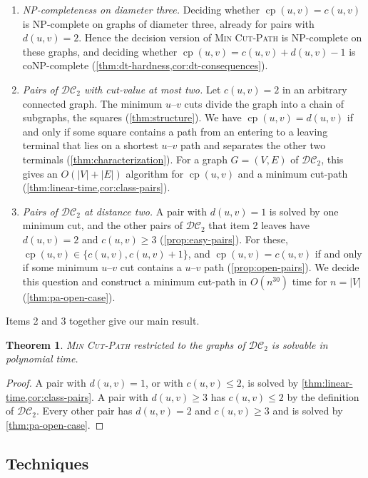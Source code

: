 \documentclass[pdflatex,sn-mathphys-num]{sn-jnl}%
\theoremstyle{thmstyleone}%
\newtheorem{theorem}{Theorem}%
\theoremstyle{thmstyletwo}%
\theoremstyle{thmstylethree}%
\newcommand{\cp}{\operatorname{cp}}%
\newcommand{\DC}{\mathcal{DC}_2}%
\newcommand{\MinCutPath}{\textsc{Min Cut-Path}}%
\begin{document}
\begin{enumerate}
\item \emph{NP-completeness on diameter three.}
Deciding whether $\cp(u, v) = c(u, v)$ is NP-complete on graphs of diameter three, already for pairs with $d(u, v) = 2$.
Hence the decision version of \MinCutPath{} is NP-complete on these graphs, and deciding whether $\cp(u, v) = c(u, v) + d(u, v) - 1$ is coNP-complete (\cref{thm:dt-hardness,cor:dt-consequences}).

\item \emph{Pairs of $\DC$ with cut-value at most two.}
Let $c(u, v) = 2$ in an arbitrary connected graph.
The minimum $u$--$v$ cuts divide the graph into a chain of subgraphs, the squares (\cref{thm:structure}).
We have $\cp(u, v) = d(u, v)$ if and only if some square contains a path from an entering to a leaving terminal that lies on a shortest $u$--$v$ path and separates the other two terminals (\cref{thm:characterization}).
For a graph $G = (V, E)$ of $\DC$, this gives an $O(|V| + |E|)$ algorithm for $\cp(u, v)$ and a minimum cut-path (\cref{thm:linear-time,cor:class-pairs}).

\item \emph{Pairs of $\DC$ at distance two.}
A pair with $d(u, v) = 1$ is solved by one minimum cut, and the other pairs of $\DC$ that item 2 leaves have $d(u, v) = 2$ and $c(u, v) \geq 3$ (\cref{prop:easy-pairs}).
For these, $\cp(u, v) \in \{c(u, v), c(u, v) + 1\}$, and $\cp(u, v) = c(u, v)$ if and only if some minimum $u$--$v$ cut contains a $u$--$v$ path (\cref{prop:open-pairs}).
We decide this question and construct a minimum cut-path in $O(n^{30})$ time for $n = |V|$ (\cref{thm:pa-open-case}).
\end{enumerate}

Items 2 and 3 together give our main result.

\begin{theorem}\label{thm:main}
\MinCutPath{} restricted to the graphs of $\DC$ is solvable in polynomial time.
\end{theorem}

\begin{proof}
A pair with $d(u, v) = 1$, or with $c(u, v) \leq 2$, is solved by \cref{thm:linear-time,cor:class-pairs}.
A pair with $d(u, v) \geq 3$ has $c(u, v) \leq 2$ by the definition of $\DC$.
Every other pair has $d(u, v) = 2$ and $c(u, v) \geq 3$ and is solved by \cref{thm:pa-open-case}.
\end{proof}

\subsection{Techniques}\label{sec:techniques}
\end{document}
